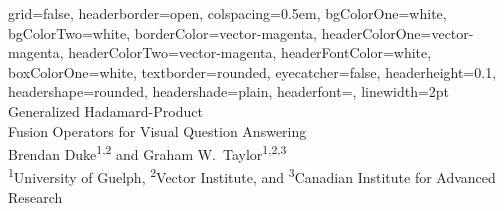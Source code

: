 \documentclass[a0paper,portrait]{baposter}
\begin{document}
\begin{poster}
{
grid=false,
headerborder=open, %
colspacing=0.5em, %
bgColorOne=white, %
bgColorTwo=white, %
borderColor=vector-magenta, %
headerColorOne=vector-magenta, %
headerColorTwo=vector-magenta, %
headerFontColor=white, %
boxColorOne=white, %
textborder=rounded, %
eyecatcher=false, %
headerheight=0.1\textheight, %
headershape=rounded, %
headershade=plain,
headerfont=\Large\textsf, %
linewidth=2pt %
}
{}
%
%
{
\textsf %
{Generalized Hadamard-Product\\
Fusion Operators for Visual Question Answering}
} %
{\sf\vspace{0em}\\
Brendan Duke\textsuperscript{1,2} and
Graham W.~Taylor\textsuperscript{1,2,3}
\vspace{0.1em}\\
\small{
\textsuperscript{1}University of Guelph,
\textsuperscript{2}Vector Institute, and 
\textsuperscript{3}Canadian Institute for Advanced Research\\
}}
\end{poster}
\end{document}
